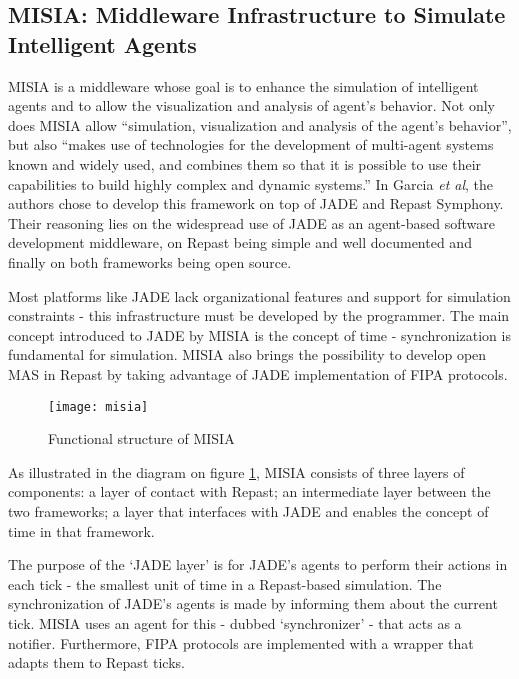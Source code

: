 \subsection{MISIA: Middleware Infrastructure to Simulate Intelligent Agents}

	MISIA is a middleware whose goal is to enhance the simulation of intelligent agents and to allow the visualization and analysis of agent's behavior. Not only does MISIA allow ``simulation, visualization and analysis of the agent’s behavior'', but also ``makes use of technologies for the development of multi-agent systems known and widely used, and combines them so that it is possible to use their capabilities to build highly complex and dynamic systems.'' In Garcia \textit{et al}, the authors chose to develop this framework on top of JADE and Repast Symphony. Their reasoning lies on the widespread use of JADE as an agent-based software development middleware, on Repast being simple and well documented and finally on both frameworks being open source. \cite{garcia2011misia}


	Most platforms like JADE lack organizational features and support for simulation constraints - this infrastructure must be developed by the programmer. The main concept introduced to JADE by MISIA is the concept of time - synchronization is fundamental for simulation. MISIA also brings the possibility to develop open MAS in Repast by taking advantage of JADE implementation of FIPA protocols.

	\begin{figure}[h]
	  \begin{center}
	    \leavevmode
	    \texttt{[image: misia]}
	    \caption{Functional structure of MISIA \cite{garcia2011misia}}
	    \label{fig:misiadiagram}
	  \end{center}
	\end{figure}

	As illustrated in the diagram on figure \ref{fig:misiadiagram}, MISIA consists of three layers of components: a layer of contact with Repast; an intermediate layer between the two frameworks; a layer that interfaces with JADE and enables the concept of time in that framework.

	The purpose of the `JADE layer' is for JADE's agents to perform their actions in each tick - the smallest unit of time in a Repast-based simulation. The synchronization of JADE's agents is made by informing them about the current tick. MISIA uses an agent for this - dubbed `synchronizer' - that acts as a notifier. Furthermore, FIPA protocols are implemented with a wrapper that adapts them to Repast ticks.

